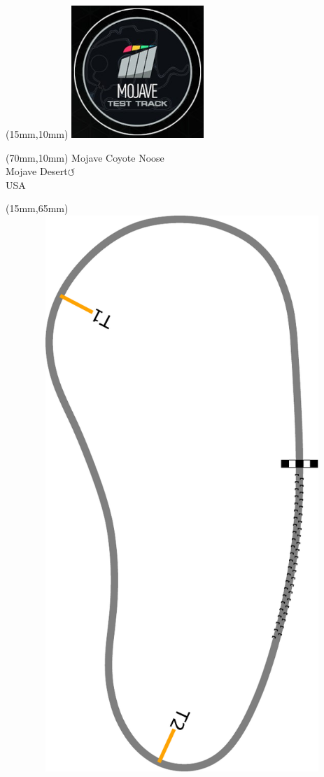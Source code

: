 \null\newpage
\begin{textblock*}{50mm}(15mm,10mm)%
\includegraphics[width=50mm]{LG/MOJA.png}
\end{textblock*}
\begin{textblock*}{130mm}(70mm,10mm)%
{\fontsize{20}{20}\selectfont Mojave Coyote Noose\\}
{\fontsize{16}{16}\selectfont Mojave Desert\hfill \huge$\circlearrowleft$\\}
{\fontsize{12}{12}\selectfont USA\\}
\end{textblock*}
\begin{textblock*}{185mm}(15mm,65mm)%
\centering
\mbox{\includegraphics[width=185mm,height=210mm,keepaspectratio]{PT/MOJACN.pdf}}
\end{textblock*}
